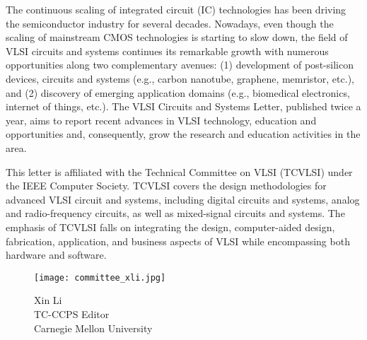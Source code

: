 
The continuous scaling of integrated circuit (IC) technologies has been driving the semiconductor industry for several decades.
Nowadays, even though the scaling of mainstream CMOS technologies is starting to slow down,
the field of VLSI circuits and systems continues its remarkable growth with numerous opportunities along two complementary avenues:
(1) development of post-silicon devices, circuits and systems (e.g., carbon nanotube, graphene, memristor, etc.),
and (2) discovery of emerging application domains (e.g., biomedical electronics, internet of things, etc.).
The VLSI Circuits and Systems Letter, published twice a year, aims to report recent advances in VLSI technology, education and opportunities and, consequently, grow the research and education activities in the area.

This letter is affiliated with the Technical Committee on VLSI (TCVLSI) under the IEEE Computer Society.
TCVLSI covers the design methodologies for advanced VLSI circuit and systems, including digital circuits and systems, analog and radio-frequency circuits, as well as mixed-signal circuits and systems.
The emphasis of TCVLSI falls on integrating the design, computer-aided design, fabrication, application, and business aspects of VLSI while encompassing both hardware and software.

\vspace{.2in}
\begin{figure}[h]
\begin{minipage}{.3\textwidth}
\texttt{[image: committee\_xli.jpg]}
\caption*{Xin Li \\ TC-CCPS Editor \\ Carnegie Mellon University}
\end{minipage}
\end{figure}

